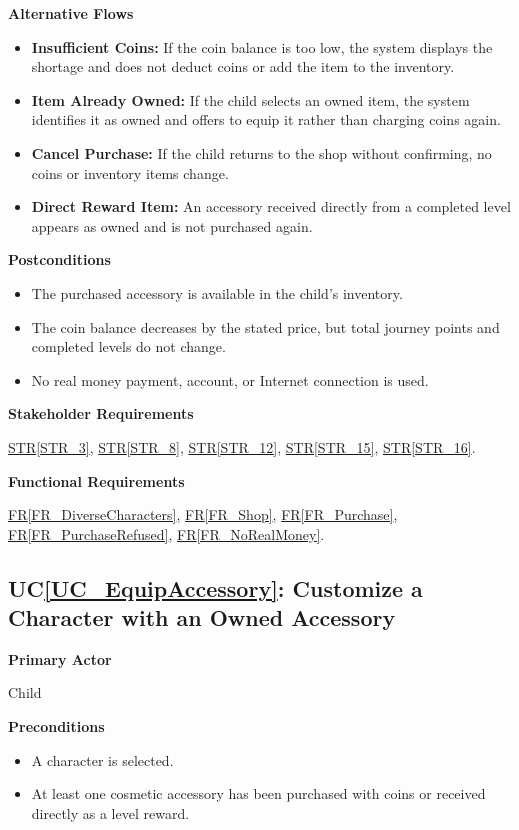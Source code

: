 \documentclass[10pt]{article}
\newcommand{\strref}[1]{\hyperref[#1]{STR\ref*{#1}}}
\newcounter{ucnum} %
\newcommand{\ucheading}[1]{UC\ref*{#1}}
\newcommand{\rref}[1]{\hyperref[#1]{FR\ref*{#1}}}
\begin{document}
\textbf{Alternative Flows}
\begin{itemize}
    \item \textbf{Insufficient Coins:} If the coin balance is too low,
    the system displays the shortage and does not deduct coins
    or add the item to the inventory.
    \item \textbf{Item Already Owned:} If the child selects an owned
    item, the system identifies it as owned and offers to equip
    it rather than charging coins again.
    \item \textbf{Cancel Purchase:} If the child returns to the shop
    without confirming, no coins or inventory items change.
    \item \textbf{Direct Reward Item:} An accessory received directly
    from a completed level appears as owned and is not purchased again.
\end{itemize}

\textbf{Postconditions}
\begin{itemize}
    \item The purchased accessory is available in the child's inventory.
    \item The coin balance decreases by the stated price, but total
    journey points and completed levels do not change.
    \item No real money payment, account, or Internet connection is used.
\end{itemize}

\textbf{Stakeholder Requirements}

\strref{STR_3}, \strref{STR_8}, \strref{STR_12}, \strref{STR_15}, \strref{STR_16}.

\textbf{Functional Requirements}

\rref{FR_DiverseCharacters}, \rref{FR_Shop}, \rref{FR_Purchase}, \rref{FR_PurchaseRefused}, \rref{FR_NoRealMoney}.

\label{UC_EquipAccessory}
\subsection{\ucheading{UC_EquipAccessory}: Customize a Character with an Owned Accessory}

\textbf{Primary Actor}

Child

\textbf{Preconditions}
\begin{itemize}
    \item A character is selected.
    \item At least one cosmetic accessory has been purchased
    with coins or received directly as a level reward.
\end{itemize}
\end{document}

